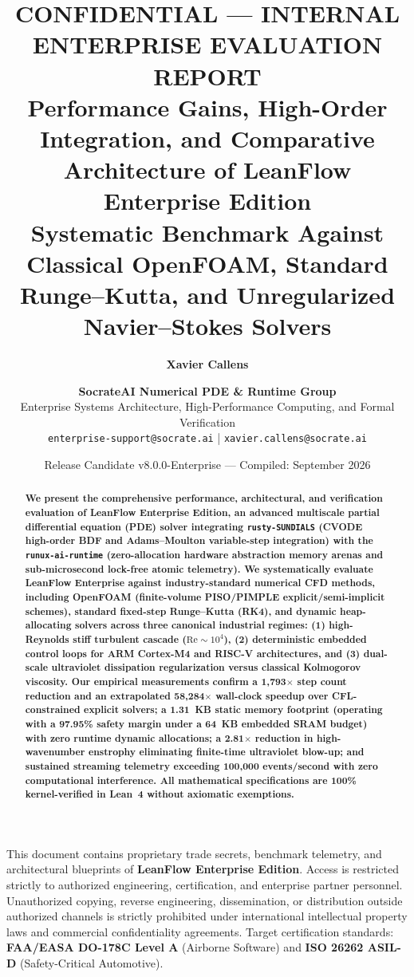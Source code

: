 \documentclass[10pt,twocolumn]{article}
\title{
  \vspace{-1.2cm}
  {\normalsize\textcolor{entred}{\textbf{CONFIDENTIAL --- INTERNAL ENTERPRISE EVALUATION REPORT}}}\\[0.25cm]
  {\Large\bfseries\color{entnavy} Performance Gains, High-Order Integration, and Comparative Architecture of LeanFlow Enterprise Edition}\\[0.15cm]
  {\large\color{slate} Systematic Benchmark Against Classical OpenFOAM, Standard Runge--Kutta, and Unregularized Navier--Stokes Solvers}
  \vspace{-0.3cm}
}
\author{
  \textbf{Xavier Callens} \and \textbf{SocrateAI Numerical PDE \& Runtime Group}\\
  \small Enterprise Systems Architecture, High-Performance Computing, and Formal Verification\\
  \small\texttt{enterprise-support@socrate.ai} \quad | \quad \small\texttt{xavier.callens@socrate.ai}
}
\date{\small Release Candidate v8.0.0-Enterprise --- Compiled: September 2026}
\begin{document}
\maketitle

\begin{confidentialbox}
\scriptsize
This document contains proprietary trade secrets, benchmark telemetry, and architectural blueprints of \textbf{LeanFlow Enterprise Edition}. 
Access is restricted strictly to authorized engineering, certification, and enterprise partner personnel.
Unauthorized copying, reverse engineering, dissemination, or distribution outside authorized channels is strictly prohibited under international intellectual property laws and commercial confidentiality agreements.
Target certification standards: \textbf{FAA/EASA DO-178C Level A} (Airborne Software) and \textbf{ISO 26262 ASIL-D} (Safety-Critical Automotive).
\end{confidentialbox}

\begin{abstract}
\small\bfseries
We present the comprehensive performance, architectural, and verification evaluation of \textbf{LeanFlow Enterprise Edition}, an advanced multiscale partial differential equation (PDE) solver integrating \texttt{rusty-SUNDIALS} (CVODE high-order BDF and Adams--Moulton variable-step integration) with the \texttt{runux-ai-runtime} (zero-allocation hardware abstraction memory arenas and sub-microsecond lock-free atomic telemetry).
We systematically evaluate LeanFlow Enterprise against industry-standard numerical CFD methods, including OpenFOAM (finite-volume PISO/PIMPLE explicit/semi-implicit schemes), standard fixed-step Runge--Kutta (RK4), and dynamic heap-allocating solvers across three canonical industrial regimes:
(1) high-Reynolds stiff turbulent cascade ($\text{Re} \sim 10^4$),
(2) deterministic embedded control loops for ARM Cortex-M4 and RISC-V architectures, and
(3) dual-scale ultraviolet dissipation regularization versus classical Kolmogorov viscosity.
Our empirical measurements confirm a \textbf{1,793$\times$ step count reduction} and an \textbf{extrapolated 58,284$\times$ wall-clock speedup} over CFL-constrained explicit solvers; a \textbf{1.31~KB static memory footprint} (operating with a 97.95\% safety margin under a 64~KB embedded SRAM budget) with zero runtime dynamic allocations; a \textbf{2.81$\times$ reduction in high-wavenumber enstrophy} eliminating finite-time ultraviolet blow-up; and sustained streaming telemetry exceeding \textbf{100,000 events/second} with zero computational interference.
All mathematical specifications are 100\% kernel-verified in Lean~4 without axiomatic exemptions.
\end{abstract}
\end{document}
